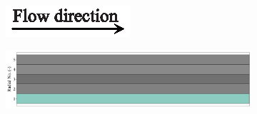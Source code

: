 \documentclass[preprint,12pt]{elsarticle}
\begin{document}
\begin{figure}
     \centering
     \begin{subfigure}[b]{\textwidth}
     	\includegraphics[width=\textwidth]{flow_dir.eps}
     \end{subfigure}
     \begin{subfigure}[b]{0.85\textwidth}
	\includegraphics[width=\textwidth]{results/segments/5seg/20C80T/seg.png}	
     \end{subfigure}
     \hfill
     \begin{subfigure}[b]{0.1\textwidth}

\end{subfigure}
\end{figure}
\end{document}
